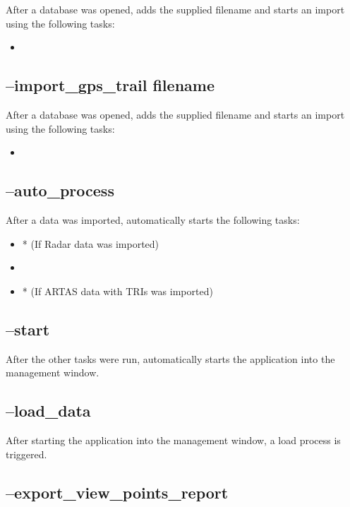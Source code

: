 After a database was opened, adds the supplied filename and starts an import using the following tasks:

\begin{itemize}
 \item {}
\end{itemize}

\subsection{--import\_gps\_trail filename}

After a database was opened, adds the supplied filename and starts an import using the following tasks:

\begin{itemize}
 \item {}
\end{itemize}

\subsection{--auto\_process}

After a data was imported, automatically starts the following tasks:

\begin{itemize}
 \item {}* (If Radar data was imported)
 \item {}
 \item {}* (If ARTAS data with TRIs was imported)
\end{itemize}

\subsection{--start}

After the other tasks were run, automatically starts the application into the management window.

\subsection{--load\_data}

After starting the application into the management window, a load process is triggered.


\subsection{--export\_view\_points\_report}

